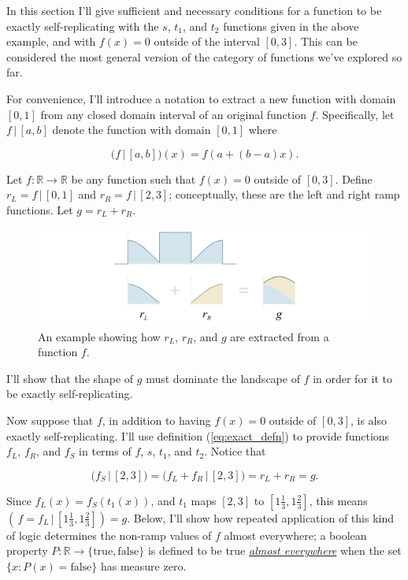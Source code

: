 \documentclass[]{article}
\begin{document}
In this section I'll give sufficient and necessary conditions for a
function to be exactly self-replicating with the \(s\), \(t_1\), and
\(t_2\) functions given in the above example, and with \(f(x)=0\)
outside of the interval \([0, 3]\). This can be considered the most
general version of the category of functions we've explored so far.

\newcommand{\restrict}{\,\big|\,}

For convenience, I'll introduce a notation to extract a new function
with domain \([0, 1]\) from any closed domain interval of an original
function \(f\). Specifically, let \(f \restrict [a, b]\) denote the
function with domain \([0,1]\) where

\[
\big(f \restrict [a,b]\big)(x) = f(a + (b-a)x).
\]

Let \(f:\mathbb{R}\to\mathbb{R}\) be any function such that \(f(x)=0\)
outside of \([0, 3]\). Define \(r_L = f\restrict [0, 1]\) and
\(r_R = f\restrict [2,3]\); conceptually, these are the left and right
ramp functions. Let \(g = r_L + r_R\).

\begin{figure}[htbp]
\centering
\includegraphics{images/pdfs/nonpl_setup.pdf}
\caption{\label{fig:nonpl_setup}An example showing how \(r_L\), \(r_R\),
and \(g\) are extracted from a function
\(f\).}\label{fig:nonplux5fsetup}
\end{figure}

I'll show that the shape of \(g\) must dominate the landscape of \(f\)
in order for it to be exactly self-replicating.

Now suppose that \(f\), in addition to having \(f(x)=0\) outside of
\([0,3]\), is also exactly self-replicating. I'll use definition
(\ref{eq:exact_defn}) to provide functions \(f_L\), \(f_R\), and \(f_S\)
in terms of \(f\), \(s\), \(t_1\), and \(t_2.\) Notice that

\[\big(f_S \restrict [2,3]\big) = \big(f_L + f_R \restrict [2, 3]\big) =
r_L + r_R = g.\]

Since \(f_L(x) = f_S(t_1(x))\), and \(t_1\) maps \([2,3]\) to
\([1\tfrac{1}{3}, 1\tfrac{2}{3}]\), this means
\((\,f=f_L \restrict [1\tfrac{1}{3}, 1\tfrac{2}{3}]) = g\). Below, I'll
show how repeated application of this kind of logic determines the
non-ramp values of \(f\) almost everywhere; a boolean property
\(P:\mathbb{R}\to\{\text{true},\text{false}\}\) is defined to be true
\href{https://en.wikipedia.org/wiki/Almost_everywhere}{\emph{almost
everywhere}} when the set \(\{x : P(x) = \text{false}\}\) has measure
zero.
\end{document}
